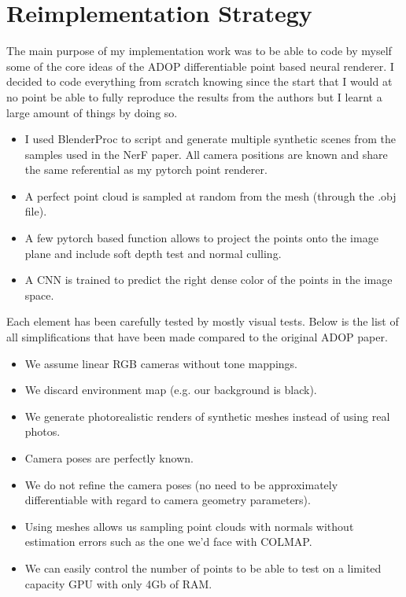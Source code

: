 \section{Reimplementation Strategy}
\label{sec:remplementation}

The main purpose of my implementation work was to be able to code by myself some of the core ideas of the ADOP differentiable point based neural renderer.
I decided to code everything from scratch knowing since the start that I would at no point be able to fully reproduce the results from the authors but I learnt a large amount of things by doing so.
\begin{itemize}
    \item I used BlenderProc \cite{Denninger2023} to script and generate multiple synthetic scenes from the samples used in the NerF paper. All camera positions are known and share the same referential as my pytorch point renderer.
    \item A perfect point cloud is sampled at random from the mesh (through the .obj file).
    \item A few pytorch based function allows to project the points onto the image plane and include soft depth test and normal culling.
    \item A CNN is trained to predict the right dense color of the points in the image space.
\end{itemize}

Each element has been carefully tested by mostly visual tests.
Below is the list of all simplifications that have been made compared to the original ADOP paper.
\begin{itemize}
    \item We assume linear RGB cameras without tone mappings.
    \item We discard environment map (e.g. our background is black).
    \item We generate photorealistic renders of synthetic meshes instead of using real photos. 
    \item Camera poses are perfectly known.
    \item We do not refine the camera poses (no need to be approximately differentiable with regard to camera geometry parameters).
    \item Using meshes allows us sampling point clouds with normals without estimation errors such as the one we'd face with COLMAP.
    \item We can easily control the number of points to be able to test on a limited capacity GPU with only 4Gb of RAM.
\end{itemize}

